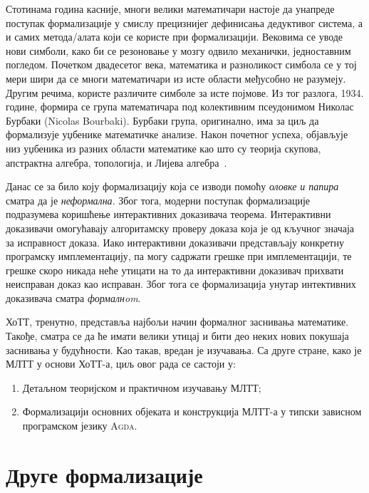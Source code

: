 \documentclass[12pt,oneside]{memoir}
\begin{document}
Стотинама година касније, многи велики математичари настоје да унапреде поступак формализације у смислу прецизнијег дефинисања дедуктивог система, а и самих метода/алата који се користе при формализацији. Вековима се уводе нови симболи, како би се резоновање у мозгу одвило механички, једноставним погледом. Почетком двадесетог века, математика и разноликост симбола се у тој мери шири да се многи математичари из исте области међусобно не разумеју. Другим речима, користе различите симболе за исте појмове. Из тог разлога, 1934. године, формира се група математичара под колективним псеудонимом Николас Бурбаки (Nicolas Bourbaki). Бурбаки група, оригинално, има за циљ да формализује уџбенике математичке анализе. Након почетног успеха, објављује низ уџбеника из разних области математике као што су теорија скупова, апстрактна алгебра, топологија, и Лијева алгебра~\cite{bur}.

Данас се за било коју формализацију која се изводи помоћу \emph{оловке и папира} сматра да је \emph{неформална}. Због тога, модерни поступак формализације подразумева коришћење интерактивних доказивача теорема. Интерактивни доказивачи омогућавају алгоритамску проверу доказа која је од кључног значаја за исправност доказа. Иако интерактивни доказивачи представљају конкретну програмску имплементацију, па могу садржати грешке при имплементацији, те грешке скоро никада неће утицати на то да интерактивни доказивач прихвати неисправан доказ као исправан. Због тога се формализација унутар интективних доказивача сматра \emph{формалнom}.

ХоТТ, тренутно, представља најбољи начин формалног заснивања математике. Такође, сматра се да ће имати велики утицај и бити део неких нових покушаја заснивања у будућности. Као такав, вредан је изучавања. Са друге стране, како је МЛТТ у основи ХоТТ-а, циљ овог рада се састоји у:
\begin{enumerate}
    \item{Детаљном теоријском и практичном изучавању МЛТТ;}
    \item{Формализацији основних објеката и конструкција МЛТТ-а у типски зависном програмском језику \textsc{Agda}.}
\end{enumerate}

\section{Друге формализације}
\end{document}
